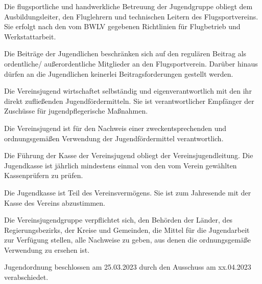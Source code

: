 \documentclass[10pt,a4paper,parskip=half]{scrartcl}
\begin{document}
\begin{contract}

    Die flugsportliche und handwerkliche Betreuung der Jugendgruppe obliegt dem Ausbildungsleiter, den Fluglehrern und technischen Leitern des Flugsportvereins. Sie erfolgt nach den vom BWLV gegebenen Richtlinien für Flugbetrieb und Werkstattarbeit.


    Die Beiträge der Jugendlichen beschränken sich auf den regulären Beitrag als ordentliche/ außerordentliche Mitglieder an den Flugsportverein. Darüber hinaus dürfen an die Jugendlichen keinerlei Beitragsforderungen gestellt werden.


    Die Vereinsjugend wirtschaftet selbständig und eigenverantwortlich mit den ihr direkt zufließenden Jugendfördermitteln. Sie ist verantwortlicher Empfänger der Zuschüsse für jugendpflegerische Maßnahmen.

    Die Vereinsjugend ist für den Nachweis einer zweckentsprechenden und ordnungsgemäßen Verwendung der Jugendfördermittel verantwortlich.

    Die Führung der Kasse der Vereinsjugend obliegt der Vereinsjugendleitung. Die Jugendkasse ist jährlich mindestens einmal von den vom Verein gewählten Kassenprüfern zu prüfen.

    Die Jugendkasse ist Teil des Vereinsvermögens. Sie ist zum Jahresende mit der Kasse des Vereins abzustimmen.

    Die Vereinsjugendgruppe verpflichtet sich, den Behörden der Länder, des Regierungsbezirks, der Kreise und Gemeinden, die Mittel für die Jugendarbeit zur Verfügung stellen, alle Nachweise zu geben, aus denen die ordnungsgemäße Verwendung zu ersehen ist.\\[10ex]

\end{contract}
Jugendordnung beschlossen am 25.03.2023 durch den Ausschuss am xx.04.2023 verabschiedet.
\end{document}
